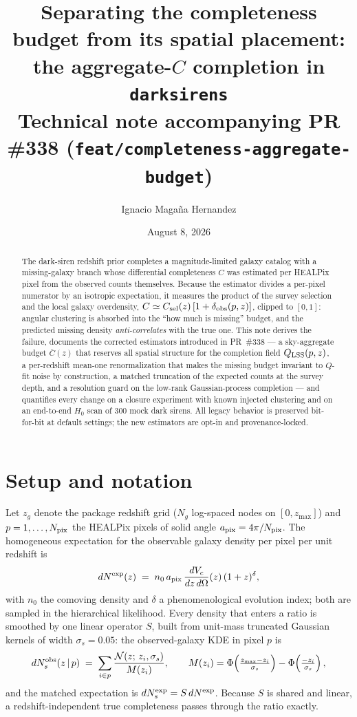 \documentclass[11pt]{article}
\title{\textbf{Separating the completeness budget from its spatial placement:\\
the aggregate-$C$ completion in \texttt{darksirens}}\\[4pt]
\large Technical note accompanying PR \#338 (\texttt{feat/completeness-aggregate-budget})}
\author{Ignacio Maga\~na Hernandez}
\date{August 8, 2026}
\newcommand{\dNobs}{dN^{\rm obs}_{s}}
\newcommand{\dNexp}{dN^{\rm exp}}
\newcommand{\dNexps}{dN^{\rm exp}_{s}}
\newcommand{\Cbar}{\bar{C}}
\newcommand{\Qlss}{Q_{\rm LSS}}
\begin{document}
\maketitle

\begin{abstract}
\noindent
The dark-siren redshift prior completes a magnitude-limited galaxy catalog with a
missing-galaxy branch whose differential completeness $C$ was estimated per HEALPix
pixel from the observed counts themselves. Because the estimator divides a per-pixel
numerator by an isotropic expectation, it measures the product of the survey selection
and the local galaxy overdensity, $C \simeq C_{\rm sel}(z)\,[1+\delta_{\rm obs}(p,z)]$,
clipped to $[0,1]$: angular clustering is absorbed into the ``how much is missing''
budget, and the predicted missing density \emph{anti-correlates} with the true one.
This note derives the failure, documents the corrected estimators introduced in
PR~\#338 --- a sky-aggregate budget $\Cbar(z)$ that reserves all spatial structure for
the completion field $\Qlss(p,z)$, a per-redshift mean-one renormalization that makes
the missing budget invariant to $Q$-fit noise by construction, a matched truncation of
the expected counts at the survey depth, and a resolution guard on the low-rank
Gaussian-process completion --- and quantifies every change on a closure experiment
with known injected clustering and on an end-to-end $H_0$ scan of 300 mock dark
sirens. All legacy behavior is preserved bit-for-bit at default settings; the new
estimators are opt-in and provenance-locked.
\end{abstract}

\section{Setup and notation}

Let $z_g$ denote the package redshift grid ($N_g$ log-spaced nodes on $[0, z_{\max}]$)
and $p = 1,\dots,N_{\rm pix}$ the HEALPix pixels of solid angle
$a_{\rm pix} = 4\pi/N_{\rm pix}$. The homogeneous expectation for the observable
galaxy density per pixel per unit redshift is
\begin{equation}
\dNexp(z) \;=\; n_0\, a_{\rm pix}\, \frac{dV_c}{dz\,d\Omega}(z)\,(1+z)^{\delta},
\label{eq:dnexp}
\end{equation}
with $n_0$ the comoving density and $\delta$ a phenomenological evolution index; both
are sampled in the hierarchical likelihood. Every density that enters a ratio is
smoothed by one linear operator $S$, built from unit-mass truncated Gaussian kernels
of width $\sigma_s = 0.05$: the observed-galaxy KDE in pixel $p$ is
\begin{equation}
\dNobs(z\,|\,p) \;=\; \sum_{i \in p} \frac{\mathcal{N}(z;\, z_i, \sigma_s)}{M(z_i)},
\qquad
M(z_i) = \Phi\!\left(\tfrac{z_{\max}-z_i}{\sigma_s}\right) - \Phi\!\left(\tfrac{-z_i}{\sigma_s}\right),
\label{eq:kde}
\end{equation}
and the matched expectation is $\dNexps = S\,\dNexp$. Because $S$ is shared and
linear, a redshift-independent true completeness passes through the ratio exactly.
\end{document}
